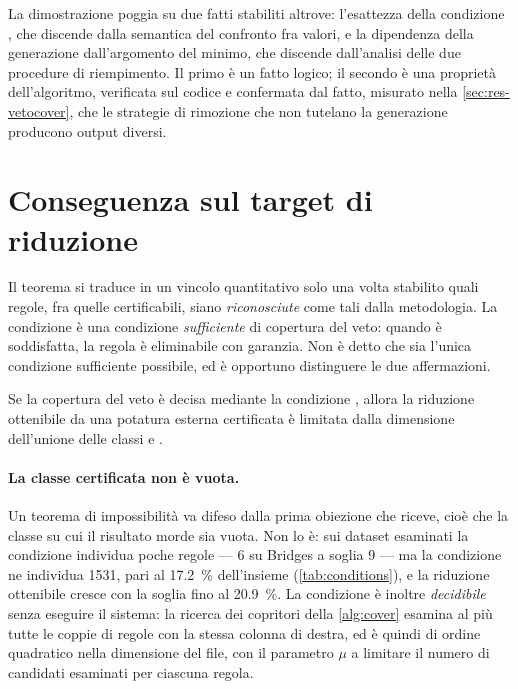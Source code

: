 La dimostrazione poggia su due fatti stabiliti altrove: l'esattezza della condizione \Vone{}, che
discende dalla semantica del confronto fra valori, e la dipendenza della generazione
dall'argomento del minimo, che discende dall'analisi delle due procedure di riempimento. Il primo
è un fatto logico; il secondo è una proprietà dell'algoritmo, verificata sul codice e confermata
dal fatto, misurato nella \autoref{sec:res-vetocover}, che le strategie di rimozione che non
tutelano la generazione producono output diversi.

\section{Conseguenza sul target di riduzione}\label{sec:target-impossible}

Il teorema si traduce in un vincolo quantitativo solo una volta stabilito quali regole, fra quelle
certificabili, siano \emph{riconosciute} come tali dalla metodologia. La condizione \Vtwo{} è una
condizione \emph{sufficiente} di copertura del veto: quando è soddisfatta, la regola è eliminabile
con garanzia. Non è detto che sia l'unica condizione sufficiente possibile, ed è opportuno
distinguere le due affermazioni.

\begin{corollary}\label{cor:target}
Se la copertura del veto è decisa mediante la condizione \Vtwo{}, allora la riduzione ottenibile
da una potatura esterna certificata è limitata dalla dimensione dell'unione delle classi \Vtwo{} e
\Vthree{}.
\end{corollary}

\paragraph{La classe certificata non è vuota.} Un teorema di impossibilità va difeso dalla prima
obiezione che riceve, cioè che la classe su cui il risultato morde sia vuota. Non lo è: sui dataset
esaminati la condizione \Vthree{} individua poche regole --- \num{6} su Bridges a soglia 9 --- ma la
condizione \Vtwo{} ne individua \num{1531}, pari al \SI{17.2}{\percent} dell'insieme
(\autoref{tab:conditions}), e la riduzione ottenibile cresce con la soglia fino al
\SI{20.9}{\percent}. La condizione è inoltre \emph{decidibile} senza eseguire il sistema: la ricerca
dei copritori della \autoref{alg:cover} esamina al più tutte le coppie di regole con la stessa
colonna di destra, ed è quindi di ordine quadratico nella dimensione del file, con il parametro
$\mu$ a limitare il numero di candidati esaminati per ciascuna regola.

